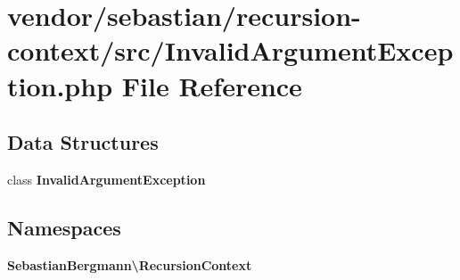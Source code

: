 \section{vendor/sebastian/recursion-\/context/src/\+Invalid\+Argument\+Exception.php File Reference}
\label{sebastian_2recursion-context_2src_2_invalid_argument_exception_8php}
\subsection*{Data Structures}
\begin{DoxyCompactItemize}
\item 
class {\bf Invalid\+Argument\+Exception}
\end{DoxyCompactItemize}
\subsection*{Namespaces}
\begin{DoxyCompactItemize}
\item 
 {\bf Sebastian\+Bergmann\textbackslash{}\+Recursion\+Context}
\end{DoxyCompactItemize}
